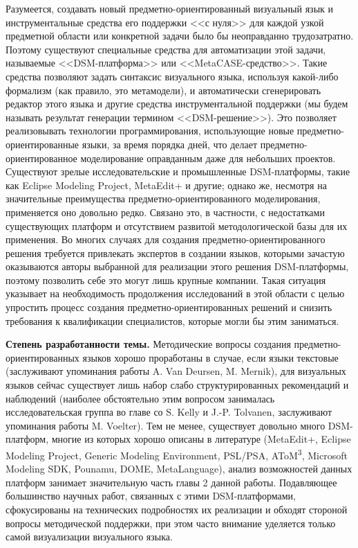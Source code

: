 Разумеется, создавать новый предметно-ориентированный визуальный язык и 
инструментальные средства его поддержки <<с нуля>> для каждой узкой предметной 
области или конкретной задачи было бы неоправданно трудозатратно. Поэтому 
существуют специальные средства для автоматизации этой задачи, называемые 
<<DSM-платформа>> или <<MetaCASE-средство>>. Такие средства позволяют задать 
синтаксис визуального языка, используя какой-либо формализм (как правило, 
это метамодели), и автоматически сгенерировать редактор этого языка и другие средства инструментальной 
поддержки (мы будем называть результат генерации термином <<DSM-решение>>). 
Это позволяет реализовывать технологии программирования, использующие новые предметно-ориентированные языки, за время 
порядка дней, что делает предметно-ориентированное моделирование оправданным 
даже для небольших проектов. Существуют зрелые исследовательские и промышленные 
DSM-платформы, такие как Eclipse Modeling Project, MetaEdit+ и другие; однако же, 
несмотря на значительные преимущества предметно-ориентированного 
моделирования, применяется оно довольно редко. Связано это, в частности, с 
недостатками существующих платформ и отсутствием развитой методологической 
базы для их применения. Во многих случаях для создания предметно-ориентированного 
решения требуется привлекать экспертов в создании языков, которыми зачастую 
оказываются авторы выбранной для реализации этого решения DSM-платформы, поэтому 
позволить себе это могут лишь крупные компании. Такая ситуация указывает на 
необходимость продолжения исследований в этой области с целью упростить процесс создания
предметно-ориентированных решений и снизить требования к квалификации специалистов, 
которые могли бы этим заниматься.

\textbf{Степень разработанности темы.}
Методические вопросы создания предметно-ориентированных языков хорошо проработаны в случае, если 
языки текстовые (заслуживают упоминания работы A. Van Deursen, M. Mernik), для визуальных
языков сейчас существует лишь набор слабо структурированных рекомендаций и наблюдений
(наиболее обстоятельно этим вопросом занималась исследовательская группа во главе 
со S. Kelly и J.-P. Tolvanen, заслуживают упоминания работы M. Voelter). Тем не менее, 
существует довольно много DSM-платформ, многие из которых хорошо описаны в литературе 
(MetaEdit+, Eclipse Modeling Project, Generic Modeling Environment, PSL/PSA, AToM\textsuperscript{3},
Microsoft Modeling SDK, Pounamu, DOME, MetaLanguage), анализ возможностей данных
платформ занимает значительную часть главы 2 данной работы. Подавляющее большинство 
научных работ, связанных с этими DSM-платформами, сфокусированы на технических подробностях
их реализации и обходят стороной вопросы методической поддержки, при этом часто внимание 
уделяется только самой визуализации визуального языка.

